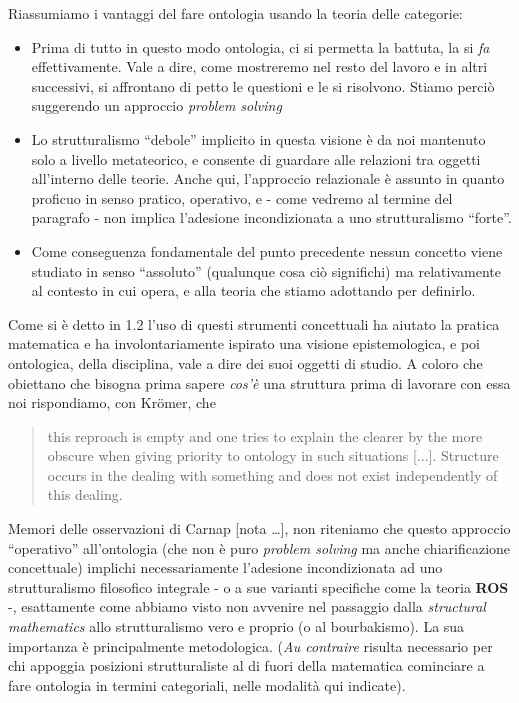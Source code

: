 Riassumiamo i vantaggi del fare ontologia usando la teoria delle categorie:
	\begin{itemize}
		\item Prima di tutto in questo modo ontologia, ci si permetta la battuta, la si \emph{fa} effettivamente. Vale a dire, come mostreremo nel resto del lavoro e in altri successivi, si affrontano di petto le questioni e le si risolvono. Stiamo perciò suggerendo un approccio \emph{problem solving}
		\item Lo strutturalismo ``debole'' implicito in questa visione è da noi mantenuto solo a livello metateorico, e consente di guardare alle relazioni tra oggetti all'interno delle teorie. Anche qui, l'approccio relazionale è assunto in quanto proficuo in senso pratico, operativo, e - come vedremo al termine del paragrafo - non implica l'adesione incondizionata a uno strutturalismo ``forte''.
		\item Come conseguenza fondamentale del punto precedente nessun concetto viene studiato in senso ``assoluto'' (qualunque cosa ciò significhi) ma relativamente al contesto in cui opera, e alla teoria che stiamo adottando per definirlo.
	\end{itemize}

	Come si è detto in 1.2 l'uso di questi strumenti concettuali ha aiutato la pratica matematica e ha involontariamente ispirato una visione epistemologica, e poi ontologica, della disciplina, vale a dire dei suoi oggetti di studio. A coloro che obiettano che bisogna prima sapere \textit{cos'è} una struttura prima di lavorare con essa noi rispondiamo, con Kr\"omer, che
\begin{quote}
	this reproach is empty and one tries to explain the clearer by the more obscure when giving priority to ontology in such situations [...]. Structure occurs in the dealing with something and does
	not exist independently of this dealing. \cite{kromer2007tool}
\end{quote}



Memori delle osservazioni di Carnap [nota \dots], non riteniamo che questo approccio ``operativo'' all'ontologia (che non è puro \textit{problem solving} ma anche chiarificazione concettuale) implichi necessariamente l'adesione incondizionata ad uno strutturalismo filosofico integrale - o a sue varianti specifiche come la teoria \textbf{ROS} -, esattamente come abbiamo visto non avvenire nel passaggio dalla \textit{structural mathematics} allo strutturalismo vero e proprio (o al bourbakismo). La sua importanza è principalmente metodologica. (\textit{Au contraire} risulta necessario per chi appoggia posizioni strutturaliste al di fuori della matematica cominciare a fare ontologia in termini categoriali, nelle modalità qui indicate).
	
